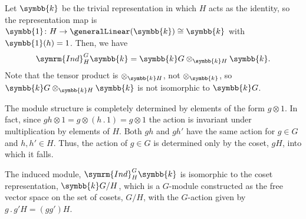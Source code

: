 \documentclass[fleqn]{NotesClass}
\renewcommand{\field}{\symbb{k}}
\newcommand{\action}{\mathbin{.}}
\newcommand{\isomorphic}{\cong}
\newcommand{\Ind}{\symrm{Ind}}
\newcommand{\one}{\symbb{1}}
\begin{document}
    \begin{exm}{}{}
        Let \(\field\) be the trivial representation in which \(H\) acts as the identity, so the representation map is \(\one \colon H \to \generalLinear(\field) \isomorphic \field\) with \(\one(h) = 1\).
        Then, we have
        \begin{equation}
            \Ind^G_H \field = \field G \otimes_{\field H} \field.
        \end{equation}
        Note that the tensor product is \(\otimes_{\field H}\), not \(\otimes_{\field}\), so \(\field G \otimes_{\field H} \field\) is not isomorphic to \(\field G\).
        
        The module structure is completely determined by elements of the form \(g \otimes 1\).
        In fact, since \(gh \otimes 1 = g \otimes (h \action 1) = g \otimes 1\) the action is invariant under multiplication by elements of \(H\).
        Both \(gh\) and \(gh'\) have the same action for \(g \in G\) and \(h, h' \in H\).
        Thus, the action of \(g \in G\) is determined only by the coset, \(gH\), into which it falls.
        
        The induced module, \(\Ind^G_H \field\) is isomorphic to the coset representation, \(\field G/H\), which is a \(G\)-module constructed as the free vector space on the set of cosets, \(G/H\), with the \(G\)-action given by \(g \action g'H = (gg')H\).
    \end{exm}
    
\end{document}
